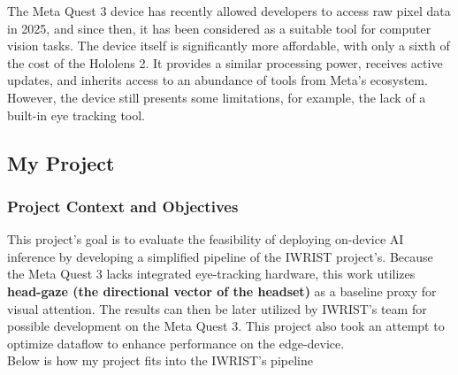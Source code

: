 \documentclass{article}
\begin{document}
The Meta Quest 3 device has recently allowed developers to access raw pixel data in 2025, and since then, it has been considered as a suitable tool for computer vision tasks. The device itself is significantly more affordable, with only a sixth of the cost of the Hololens 2. It provides a similar processing power, receives active updates, and inherits access to an abundance of tools from Meta's ecosystem. However, the device still presents some limitations, for example, the lack of a built-in eye tracking tool.

\subsection{My Project}
\subsubsection{Project Context and Objectives}

This project's goal is to evaluate the feasibility of deploying on-device AI inference by developing a simplified pipeline of the IWRIST project's. Because the Meta Quest 3 lacks integrated eye-tracking hardware, this work utilizes \textbf{head-gaze (the directional vector of the headset)} as a baseline proxy for visual attention. The results can then be later utilized by IWRIST's team for possible development on the Meta Quest 3. This project also took an attempt to optimize dataflow to enhance performance on the edge-device.\\

Below is how my project fits into the IWRIST's pipeline
\end{document}
